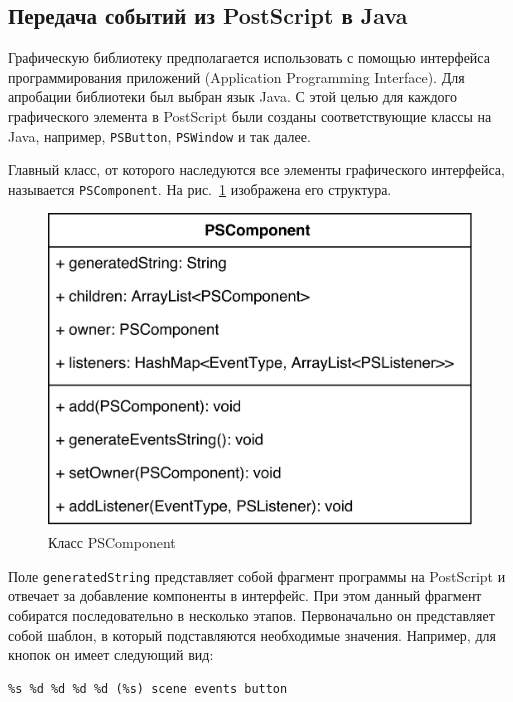 \subsection{Передача событий из PostScript в Java}

Графическую библиотеку предполагается использовать с помощью интерфейса программирования приложений (Application Programming Interface). Для апробации библиотеки был выбран язык Java. С этой целью для каждого графического элемента в PostScript были созданы соответствующие классы на Java, например, \texttt{PSButton}, \texttt{PSWindow} и так далее.

Главный класс, от которого наследуются все элементы графического интерфейса, называется \texttt{PSComponent}. На рис.~\ref{pscomponent} изображена его структура.

\begin{figure}[h]
\centering
\includegraphics[width=\textwidth]{Makulov/PSComponent_structure.png}
\caption{Класс PSComponent}
\label{pscomponent}
\end{figure}


Поле \texttt{generatedString} представляет собой фрагмент программы на PostScript и отвечает за добавление компоненты в интерфейс. При этом данный фрагмент собиратся последовательно в несколько этапов. Первоначально он представляет собой шаблон, в который подставляются необходимые значения. Например, для кнопок он имеет следующий вид:

\lstset{language=Java,basicstyle=\footnotesize\ttfamily} 
\begin{lstlisting}
%s %d %d %d %d (%s) scene events button
\end{lstlisting}

